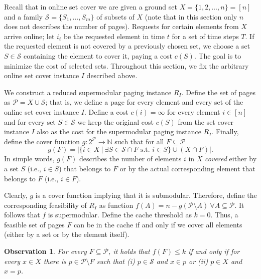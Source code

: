\documentclass[11pt]{article}
\newcommand{\cP}{{\mathcal{P}}}
\newcommand{\cS}{{\mathcal{S}}}
\newtheorem{obs}[thm]{Observation}
\begin{document}
 Recall that in online set cover we are given  a ground set $X = \{1,2,\ldots, n\} = [n]$ and a family $\cS = \{S_1,\ldots, S_m\}$ of subsets of $X$ (note that in this section only $n$ does not describes the number of pages). Requests for certain elements from $X$ arrive online; let $i_t$ be the requested element in time $t$ for a set of time steps $T$. If the requested element is not covered by a previously chosen set, we choose a set $S \in \cS$ containing the element to cover it, paying a cost $c(S)$. The goal is to minimize the cost of selected sets. Throughout this section, we fix the arbitrary online set cover instance $I$ described above. 

We construct a reduced supermodular paging instance $R_I$. Define the set of pages as $\cP = X \cup \cS$; that is, we define a page for every element and every set of the online set cover instance $I$. Define a cost $c(i) = \infty$ for every element $i \in [n]$ and for every set $S \in \cS$ we keep the original cost $c(S)$ from the set cover instance $I$ also as the cost for the supermodular paging instance $R_I$. Finally, define the cover function $g: 2^{\cP} \rightarrow \mathbb{N}$ such that for all $F \subseteq \cP$ 
\begin{equation}
	\label{eq:g}
	g(F) = \left| \{i \in X~|~ \exists S \in \cS \cap F \text{ s.t. } i \in S\} \cup \left(X \cap F\right) \right|. 
\end{equation} In simple words, $g(F)$ describes the number of elements $i$ in $X$ {\em covered} either by a set $S$ (i.e., $i \in S$) that belongs to $F$ or by the actual corresponding element that belongs to $F$ (i.e., $i \in F$). %

 Clearly, $g$ is a cover function implying that it is submodular. Therefore, define the corresponding feasibility of $R_I$ as function $f(A) = n-g(\cP \setminus A)~\forall A \subseteq \cP$. It follows that $f$ is supermodular. Define the cache threshold as $k = 0$. Thus, a feasible set of pages $F$ can be in the cache if and only if we cover all elements (either by a set or by the element itself). 



\begin{obs}
	\label{obs:F}
	For every $F \subseteq \cP$, it holds that $f(F) \leq k$ if and only if for every $x \in X$ there is $p \in \cP \setminus F$ such that (i) $p \in \cS$ and $x \in p$ or (ii) $p \in X$ and $x = p$. 
\end{obs}
\end{document}
